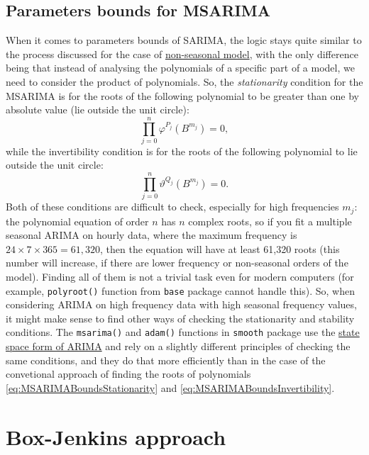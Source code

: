 \documentclass[
]{book}
\theoremstyle{definition}
\theoremstyle{definition}
\theoremstyle{definition}
\theoremstyle{definition}
\theoremstyle{remark}
\begin{document}
\hypertarget{MSARIMABounds}{%
\subsection{Parameters bounds for MSARIMA}\label{MSARIMABounds}}

When it comes to parameters bounds of SARIMA, the logic stays quite similar to the process discussed for the case of \protect\hyperlink{ARIMABounds}{non-seasonal model}, with the only difference being that instead of analysing the polynomials of a specific part of a model, we need to consider the product of polynomials. So, the \emph{stationarity} condition for the MSARIMA is for the roots of the following polynomial to be greater than one by absolute value (lie outside the unit circle):
\begin{equation}
  \prod_{j=0}^n \varphi^{P_j}(B^{m_j}) = 0,
  \label{eq:MSARIMABoundsStationarity}
\end{equation}
while the invertibility condition is for the roots of the following polynomial to lie outside the unit circle:
\begin{equation}
  \prod_{j=0}^n \vartheta^{Q_j}(B^{m_j}) = 0.
  \label{eq:MSARIMABoundsInvertibility}
\end{equation}
Both of these conditions are difficult to check, especially for high frequencies \(m_j\): the polynomial equation of order \(n\) has \(n\) complex roots, so if you fit a multiple seasonal ARIMA on hourly data, where the maximum frequency is \(24\times 7\times 365 = 61,320\), then the equation will have at least 61,320 roots (this number will increase, if there are lower frequency or non-seasonal orders of the model). Finding all of them is not a trivial task even for modern computers (for example, \texttt{polyroot()} function from \texttt{base} package cannot handle this). So, when considering ARIMA on high frequency data with high seasonal frequency values, it might make sense to find other ways of checking the stationarity and stability conditions. The \texttt{msarima()} and \texttt{adam()} functions in \texttt{smooth} package use the \protect\hyperlink{StateSpaceARIMA}{state space form of ARIMA} and rely on a slightly different principles of checking the same conditions, and they do that more efficiently than in the case of the convetional approach of finding the roots of polynomials \eqref{eq:MSARIMABoundsStationarity} and \eqref{eq:MSARIMABoundsInvertibility}.

\hypertarget{BJApproach}{%
\section{Box-Jenkins approach}\label{BJApproach}}
\end{document}
